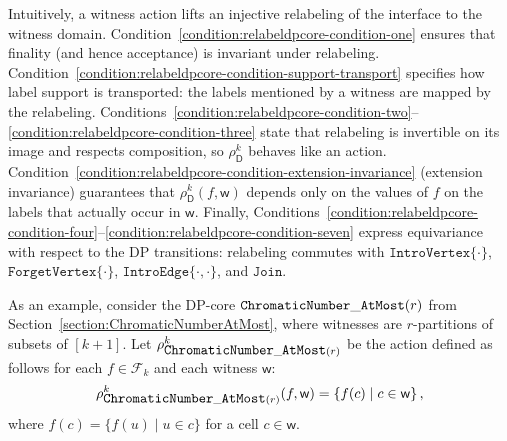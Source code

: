 \documentclass[11pt,a4paper]{article}
\newcommand{\treewidthvalue}{k}
\newcommand{\introvertextype}[1]{\mathtt{IntroVertex}\{#1\}}
\newcommand{\introedgetype}[2]{\mathtt{IntroEdge}\{#1,#2\}}
\newcommand{\forgetvertextype}[1]{\mathtt{ForgetVertex}\{#1\}}
\newcommand{\jointype}{\mathtt{Join}}
\newcommand{\vertexone}{u}
\newcommand{\awitness}{\mathsf{w}}
\newcommand{\dpcore}{\mathsf{D}}
\newcommand{\dpNamePart}[1]{\mbox{\normalfont\ttfamily #1}}
\newcommand{\numbercolors}{r}
\newcommand{\chromaticnumberAtMostCore}[1]{\dpNamePart{ChromaticNumber}\_\allowbreak\dpNamePart{AtMost}(#1)}
\newcommand{\relabelingfunction}{f}
\newcommand{\relabelclass}{\mathcal{F}}
\newcommand{\action}{\rho}
\begin{document}
Intuitively, a witness action lifts an injective relabeling of the interface to the witness domain. Condition~\ref{condition:relabeldpcore-condition-one} ensures that finality (and hence acceptance) is invariant under relabeling. Condition~\ref{condition:relabeldpcore-condition-support-transport} specifies how label support is transported: the labels mentioned by a witness are mapped by the relabeling. Conditions~\ref{condition:relabeldpcore-condition-two}--\ref{condition:relabeldpcore-condition-three} state that relabeling is invertible on its image and respects composition, so $\action_{\dpcore}^{\treewidthvalue}$ behaves like an action. Condition~\ref{condition:relabeldpcore-condition-extension-invariance} (extension invariance) guarantees that $\action_{\dpcore}^{\treewidthvalue}(\relabelingfunction,\awitness)$ depends only on the values of $\relabelingfunction$ on the labels that actually occur in $\awitness$. Finally, Conditions~\ref{condition:relabeldpcore-condition-four}--\ref{condition:relabeldpcore-condition-seven} express equivariance with respect to the DP transitions: relabeling commutes with $\introvertextype{\cdot}$, $\forgetvertextype{\cdot}$, $\introedgetype{\cdot}{\cdot}$, and $\jointype$.

As an example, consider the DP-core $\chromaticnumberAtMostCore{\numbercolors}$ from Section~\ref{section:ChromaticNumberAtMost}, where witnesses are $\numbercolors$-partitions of subsets of $[\treewidthvalue+1]$.
Let $\action_{\chromaticnumberAtMostCore{\numbercolors}}^\treewidthvalue$ be the action defined as follows for each $\relabelingfunction \in \relabelclass_\treewidthvalue$ and each witness $\awitness$:
\[
\action_{\chromaticnumberAtMostCore{\numbercolors}}^\treewidthvalue(\relabelingfunction, \awitness) = \left\{ \relabelingfunction(c) \mid c \in \awitness \right\},
\]
where $\relabelingfunction(c) = \{ \relabelingfunction(\vertexone) \mid \vertexone \in c \}$ for a cell $c\in \awitness$.
\end{document}
